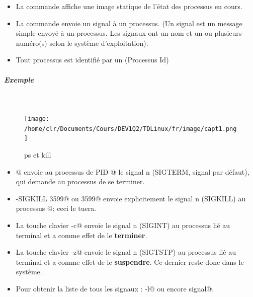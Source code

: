 \documentclass[11pt,a4paper]{article}
\begin{document}
			\begin{boxedminipage}[h]{\linewidth}
		
					\begin{itemize}
				
			\item 
						La commande \verb@ps@
						affiche une image statique de l'\'etat des processus en cours.
					
			\item 
						La commande \verb@kill@
						envoie un signal \`a un processus.
						(Un signal est un message simple envoy\'e \`a un processus.
						Les signaux ont un nom et un ou plusieurs num\'ero(s)
						selon le syst\`eme d'exploitation).
					
			\item 
						Tout processus est identifi\'e par un
						\verb@PID@ (Processus Id)
					\end{itemize}
				
			\end{boxedminipage}

			
		\subparagraph{Exemple} 
		
					\textcolor{white}{.} \par
				
            \par
        \begin{figure}[hbt]
				    \begin{center}
					\texttt{[image: /home/clr/Documents/Cours/DEV1Q2/TDLinux/fr/image/capt1.png]}
						\end{center}
                
                    \caption[ps et kill]{ps et kill}
                \end{figure}
                    
					\begin{itemize}
				
			\item {}@
						envoie au processus de PID 
						@
						le signal n (SIGTERM, signal par d\'efaut),
						qui demande au processus de se terminer.
					
			\item \verb@kill -SIGKILL 3599@ 
						ou  3599@
						envoie explicitement le signal n (SIGKILL) au processus 
						@; ceci le tuera.
					
			\item 
						La touche clavier \verb@Ctrl-c@
						envoie le signal n (SIGINT) au processus li\'e au terminal
						et a comme effet de le
						\textbf{terminer}.
					
			\item 
						La touche clavier \verb@Ctrl-z@
						envoie le signal n (SIGTSTP) au processus li\'e au terminal
						et a comme effet de le 
						\textbf{suspendre}.
						Ce dernier reste donc dans le syst\`eme.
					
			\item 
						Pour obtenir la liste de tous les signaux :
						\verb@kill -l@ ou 
						encore  signal@.
					
					\end{itemize}
				
\end{document}
